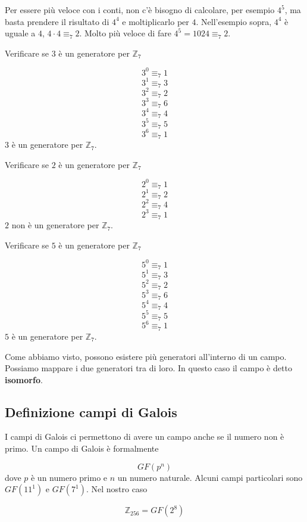 \documentclass[12pt]{report}
\begin{document}
    \noindent
    Per essere più veloce con i conti, non c'è bisogno di calcolare, per esempio $4^5$, ma basta prendere il risultato di $4^4$ e moltiplicarlo per $4$. Nell'esempio sopra,  $4^4$ è uguale a $4$, $4 \cdot 4 \equiv_7 2$. Molto più veloce di fare $4^5 = 1024 \equiv_7 2$.

    \begin{es}
        Verificare se $3$ è un generatore per $\mathbb{Z}_7$


        $$3^0  \equiv_7 1 $$
        $$3^1  \equiv_7 3 $$
        $$3^2  \equiv_7 2 $$
        $$3^3  \equiv_7 6 $$
        $$3^4  \equiv_7 4 $$
        $$3^5  \equiv_7 5 $$
        $$3^6  \equiv_7 1 $$
        $3$ è un generatore per $\mathbb{Z}_7$.
    \end{es}

    \begin{es}
        Verificare se $2$ è un generatore per $\mathbb{Z}_7$


        $$2^0  \equiv_7 1 $$
        $$2^1  \equiv_7 2 $$
        $$2^2  \equiv_7 4 $$
        $$2^3  \equiv_7 1 $$
        $2$ non è un generatore per $\mathbb{Z}_7$.
    \end{es}

    \begin{es}
        Verificare se $5$ è un generatore per $\mathbb{Z}_7$

        $$5^0  \equiv_7 1 $$
        $$5^1  \equiv_7 3 $$
        $$5^2  \equiv_7 2 $$
        $$5^3  \equiv_7 6 $$
        $$5^4  \equiv_7 4 $$
        $$5^5  \equiv_7 5 $$
        $$5^6  \equiv_7 1 $$
        $5$ è un generatore per $\mathbb{Z}_7$.
    \end{es}

    \noindent
    Come abbiamo visto, possono esistere più generatori all'interno di un campo. Possiamo mappare i due generatori tra di loro. In questo caso il campo è detto \textbf{isomorfo}.

    \subsection{Definizione campi di Galois}
    I campi di Galois ci permettono di avere un campo anche se il numero non è primo.
    Un campo di Galois è formalmente

    $$GF(p^n)$$
    dove $p$ è un numero primo e $n$ un numero naturale. Alcuni campi particolari sono $GF(11^1)$ e $GF(7^1)$. Nel nostro caso

    $$\mathbb{Z}_{256} = GF(2^8)$$
\end{document}
